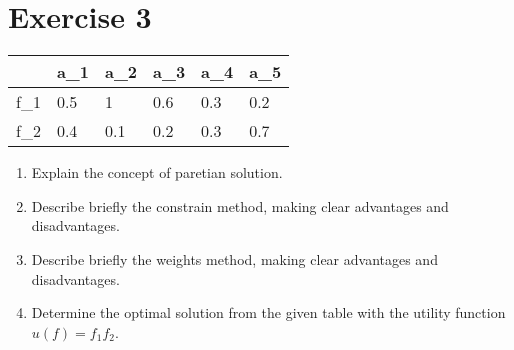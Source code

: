 \documentclass[\main/main.tex]{subfiles}
\begin{document}
\section{Exercise 3}
\begin{table}
  \begin{tabular}{L|LLLLL}
        & a_1 & a_2 & a_3 & a_4 & a_5 \\
    \hline
    f_1 & 0.5 & 1   & 0.6 & 0.3 & 0.2 \\
    f_2 & 0.4 & 0.1 & 0.2 & 0.3 & 0.7 \\
  \end{tabular}
\end{table}
\begin{enumerate}
  \item Explain the concept of paretian solution.
  \item Describe briefly the constrain method, making clear advantages and disadvantages.
  \item Describe briefly the weights method, making clear advantages and disadvantages.
  \item Determine the optimal solution from the given table with the utility function $u(f) = f_1f_2$.
\end{enumerate}
\end{document}
